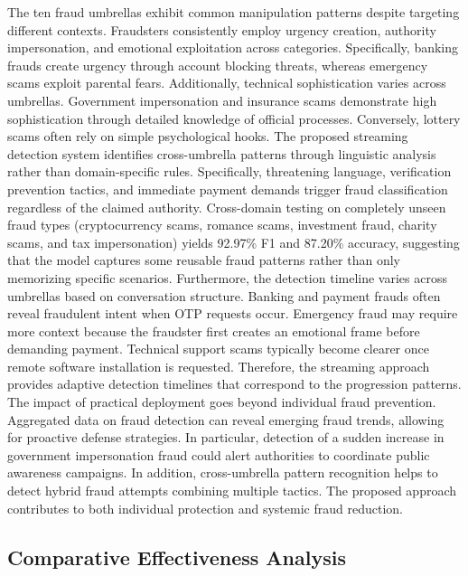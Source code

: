 \documentclass{article}
\begin{document}
The ten fraud umbrellas exhibit common manipulation patterns despite targeting different contexts. Fraudsters consistently employ urgency creation, authority impersonation, and emotional exploitation across categories. Specifically, banking frauds create urgency through account blocking threats, whereas emergency scams exploit parental fears. Additionally, technical sophistication varies across umbrellas. Government impersonation and insurance scams demonstrate high sophistication through detailed knowledge of official processes. Conversely, lottery scams often rely on simple psychological hooks. The proposed streaming detection system identifies cross-umbrella patterns through linguistic analysis rather than domain-specific rules. Specifically, threatening language, verification prevention tactics, and immediate payment demands trigger fraud classification regardless of the claimed authority. Cross-domain testing on completely unseen fraud types (cryptocurrency scams, romance scams, investment fraud, charity scams, and tax impersonation) yields 92.97\% F1 and 87.20\% accuracy, suggesting that the model captures some reusable fraud patterns rather than only memorizing specific scenarios. Furthermore, the detection timeline varies across umbrellas based on conversation structure. Banking and payment frauds often reveal fraudulent intent when OTP requests occur. Emergency fraud may require more context because the fraudster first creates an emotional frame before demanding payment. Technical support scams typically become clearer once remote software installation is requested. Therefore, the streaming approach provides adaptive detection timelines that correspond to the progression patterns. The impact of practical deployment goes beyond individual fraud prevention. Aggregated data on fraud detection can reveal emerging fraud trends, allowing for proactive defense strategies. In particular, detection of a sudden increase in government impersonation fraud could alert authorities to coordinate public awareness campaigns. In addition, cross-umbrella pattern recognition helps to detect hybrid fraud attempts combining multiple tactics. The proposed approach contributes to both individual protection and systemic fraud reduction.

\subsection{Comparative Effectiveness Analysis}
\label{app:casestudy:effectiveness}
\end{document}
